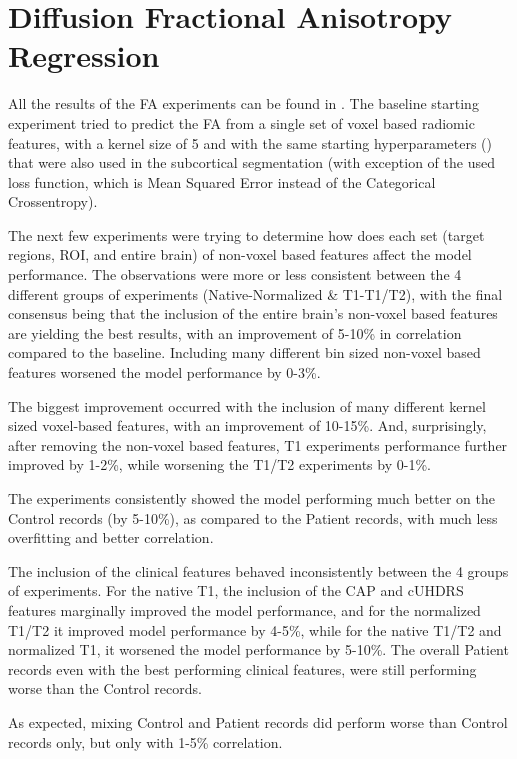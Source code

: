 \section{Diffusion Fractional Anisotropy Regression}

All the results of the \ac{FA} experiments can be found in  .
The baseline starting experiment tried to predict the \ac{FA} from a single set of voxel based radiomic features, with a kernel size of 5 and with the same starting hyperparameters () that were also used in the subcortical segmentation (with exception of the used loss function, which is Mean Squared Error instead of the Categorical Crossentropy).\par
The next few experiments were trying to determine how does each set (target regions, \ac{ROI}, and entire brain) of non-voxel based features affect the model performance. The observations were more or less consistent between the 4 different groups of experiments (Native-Normalized \& T1-T1/T2), with the final consensus being that the inclusion of the entire brain's non-voxel based features are yielding the best results, with an improvement of 5-10\% in correlation compared to the baseline. Including many different bin sized non-voxel based features worsened the model performance by 0-3\%.\par
The biggest improvement occurred with the inclusion of many different kernel sized voxel-based features, with an improvement of 10-15\%. And, surprisingly, after removing the non-voxel based features, T1 experiments performance further improved by 1-2\%, while worsening the T1/T2 experiments by 0-1\%.\par
The experiments consistently showed the model performing much better on the Control records (by 5-10\%), as compared to the Patient records, with much less overfitting and better correlation.\par
The inclusion of the clinical features behaved inconsistently between the 4 groups of experiments. For the native T1, the inclusion of the \ac{CAP} and \ac{cUHDRS} features marginally improved the model performance, and for the normalized T1/T2 it improved model performance by 4-5\%, while for the native T1/T2 and normalized T1, it worsened the model performance by 5-10\%. The overall Patient records even with the best performing clinical features, were still performing worse than the Control records.\par
As expected, mixing Control and Patient records did perform worse than Control records only, but only with 1-5\% correlation.\par
